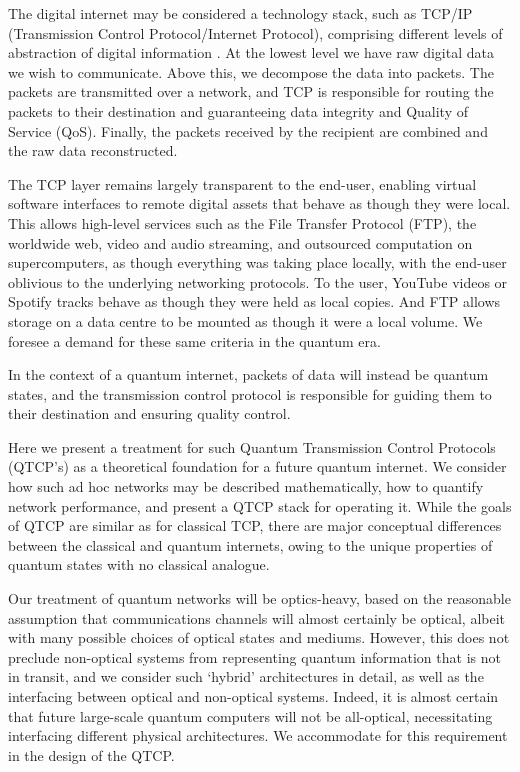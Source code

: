 \documentclass[aps,rmp,twocolumn,amsmath,amssymb,nofootinbib,superscriptaddress]{revtex4}
\begin{document}
The digital internet may be considered a technology stack, such as TCP/IP (Transmission Control Protocol/Internet Protocol), comprising different levels of abstraction of digital information \cite{textbookOnNetworking}. At the lowest level we have raw digital data we wish to communicate. Above this, we decompose the data into packets. The packets are transmitted over a network, and TCP is responsible for routing the packets to their destination and guaranteeing data integrity and Quality of Service ({\sc QoS}). Finally, the packets received by the recipient are combined and the raw data reconstructed.

The TCP layer remains largely transparent to the end-user, enabling virtual software interfaces to remote digital assets that behave as though they were local. This allows high-level services such as the File Transfer Protocol (FTP), the worldwide web, video and audio streaming, and outsourced computation on supercomputers, as though everything was taking place locally, with the end-user oblivious to the underlying networking protocols. To the user, YouTube videos or Spotify tracks behave as though they were held as local copies. And FTP allows storage on a data centre to be mounted as though it were a local volume. We foresee a demand for these same criteria in the quantum era.

In the context of a quantum internet, packets of data will instead be quantum states, and the transmission control protocol is responsible for guiding them to their destination and ensuring quality control.

Here we present a treatment for such Quantum Transmission Control Protocols (QTCP's) as a theoretical foundation for a future quantum internet. We consider how such ad hoc networks may be described mathematically, how to quantify network performance, and present a QTCP stack for operating it. While the goals of QTCP are similar as for classical TCP, there are major conceptual differences between the classical and quantum internets, owing to the unique properties of quantum states with no classical analogue.

Our treatment of quantum networks will be optics-heavy, based on the reasonable assumption that communications channels will almost certainly be optical, albeit with many possible choices of optical states and mediums. However, this does not preclude non-optical systems from representing quantum information that is not in transit, and we consider such `hybrid' architectures in detail, as well as the interfacing between optical and non-optical systems. Indeed, it is almost certain that future large-scale quantum computers will not be all-optical, necessitating interfacing different physical architectures. We accommodate for this requirement in the design of the QTCP.
\end{document}
